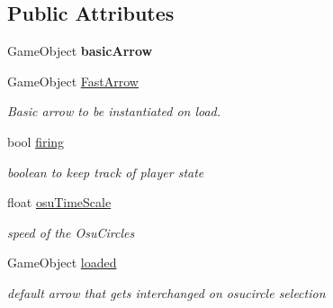 \subsection*{Public Attributes}
\begin{DoxyCompactItemize}
\item 
\mbox{\label{class_spell_controller_a70254f75318edd987407835df7806046}} 
Game\+Object {\bfseries basic\+Arrow}
\item 
Game\+Object \hyperlink{class_spell_controller_aa36968ec27a32acb26ec87db86af9415}{Fast\+Arrow}
\begin{DoxyCompactList}\small\item\em Basic arrow to be instantiated on load. \end{DoxyCompactList}\item 
\mbox{\label{class_spell_controller_a2d0099eccd4c793b1a97ad6bde7a0733}} 
bool \hyperlink{class_spell_controller_a2d0099eccd4c793b1a97ad6bde7a0733}{firing}
\begin{DoxyCompactList}\small\item\em boolean to keep track of player state \end{DoxyCompactList}\item 
\mbox{\label{class_spell_controller_a6d3ca0bdc911a31cf5036441339b075c}} 
float \hyperlink{class_spell_controller_a6d3ca0bdc911a31cf5036441339b075c}{osu\+Time\+Scale}
\begin{DoxyCompactList}\small\item\em speed of the Osu\+Circles \end{DoxyCompactList}\item 
\mbox{\label{class_spell_controller_a16ce771d6fc67978547d50e604d8e3d9}} 
Game\+Object \hyperlink{class_spell_controller_a16ce771d6fc67978547d50e604d8e3d9}{loaded}
\begin{DoxyCompactList}\small\item\em default arrow that gets interchanged on osucircle selection \end{DoxyCompactList}\end{DoxyCompactItemize}
